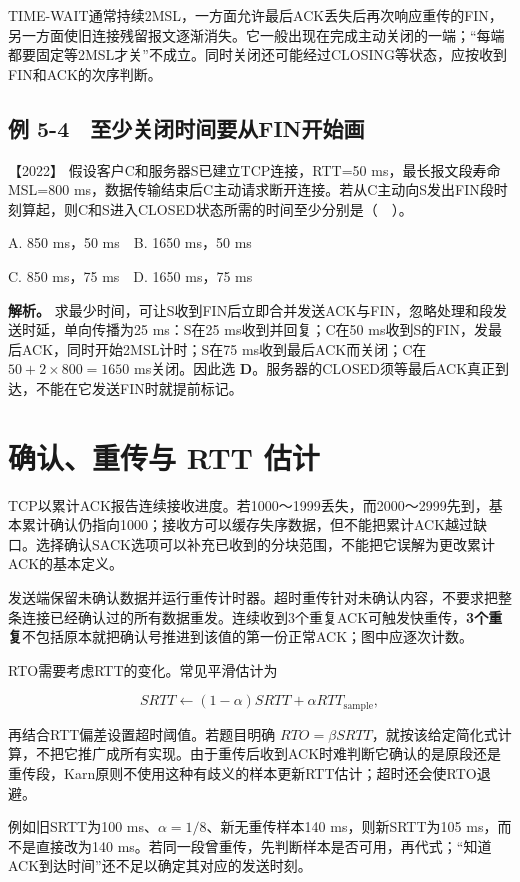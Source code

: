 TIME-WAIT通常持续2MSL，一方面允许最后ACK丢失后再次响应重传的FIN，另一方面使旧连接残留报文逐渐消失。它一般出现在完成主动关闭的一端；``每端都要固定等2MSL才关''不成立。同时关闭还可能经过CLOSING等状态，应按收到FIN和ACK的次序判断。

\subsection{例 5-4　至少关闭时间要从FIN开始画}\label{cn-ex5-4}

\noindent{}【2022】 假设客户C和服务器S已建立TCP连接，RTT=50 ms，最长报文段寿命MSL=800 ms，数据传输结束后C主动请求断开连接。若从C主动向S发出FIN段时刻算起，则C和S进入CLOSED状态所需的时间至少分别是（　）。

A. 850 ms，50 ms　B. 1650 ms，50 ms

C. 850 ms，75 ms　D. 1650 ms，75 ms


\textbf{解析。} 求最少时间，可让S收到FIN后立即合并发送ACK与FIN，忽略处理和段发送时延，单向传播为25 ms：S在25 ms收到并回复；C在50 ms收到S的FIN，发最后ACK，同时开始2MSL计时；S在75 ms收到最后ACK而关闭；C在 \(50+2\times800=1650\) ms关闭。因此选 \textbf{D}。服务器的CLOSED须等最后ACK真正到达，不能在它发送FIN时就提前标记。

\section{确认、重传与 RTT 估计}\label{cn-05-06}

TCP以累计ACK报告连续接收进度。若1000～1999丢失，而2000～2999先到，基本累计确认仍指向1000；接收方可以缓存失序数据，但不能把累计ACK越过缺口。选择确认SACK选项可以补充已收到的分块范围，不能把它误解为更改累计ACK的基本定义。

发送端保留未确认数据并运行重传计时器。超时重传针对未确认内容，不要求把整条连接已经确认过的所有数据重发。连续收到3个重复ACK可触发快重传，\textbf{3个重复}不包括原本就把确认号推进到该值的第一份正常ACK；图中应逐次计数。

RTO需要考虑RTT的变化。常见平滑估计为

\[SRTT\leftarrow(1-\alpha)SRTT+\alpha RTT_{\mathrm{sample}},\]

再结合RTT偏差设置超时阈值。若题目明确 \(RTO=\beta SRTT\)，就按该给定简化式计算，不把它推广成所有实现。由于重传后收到ACK时难判断它确认的是原段还是重传段，Karn原则不使用这种有歧义的样本更新RTT估计；超时还会使RTO退避。

例如旧SRTT为100 ms、\(\alpha=1/8\)、新无重传样本140 ms，则新SRTT为105 ms，而不是直接改为140 ms。若同一段曾重传，先判断样本是否可用，再代式；``知道ACK到达时间''还不足以确定其对应的发送时刻。

